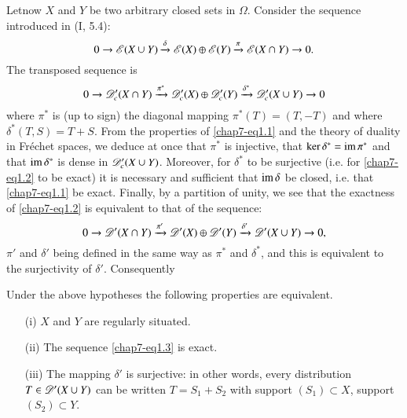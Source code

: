 \eject

Let\pageoriginale now $X$ and $Y$ be two arbitrary closed sets in $\Omega$. Consider the sequence introduced in (I, 5.4):
\begin{equation}
0\to \mathscr{E}(X\cup Y)\xrightarrow{\delta}\mathscr{E}(X)\oplus \mathscr{E}(Y)\xrightarrow{\pi}\mathscr{E}(X\cap Y)\to 0.\label{chap7-eq1.1}
\end{equation}
The transposed sequence is
\begin{equation}
0\to \mathscr{D}'_{c}(X\cap Y)\xrightarrow{\pi^{*}}\mathscr{D}'_{c}(X)\oplus \mathscr{D}'_{c}(Y)\xrightarrow{\delta^{*}}\mathscr{D}'_{c}(X\cup Y)\to 0\label{chap7-eq1.2}
\end{equation}
where $\pi^{*}$ is (up to sign) the diagonal mapping $\pi^{*}(T)=(T,-T)$ and where $\delta^{*}(T,S)=T+S$. From the properties of \eqref{chap7-eq1.1} and the theory of duality in Fr\'echet spaces, we deduce at once that $\pi^{*}$ is injective, that $\ker \delta^{*}=\operatorname{im} \pi^{*}$ and that $\operatorname{im} \delta^{*}$ is dense in $\mathscr{D}'_{c}(X\cup Y)$. Moreover, for $\delta^{*}$ to be surjective (i.e. for \eqref{chap7-eq1.2} to be exact) it is necessary and sufficient that $\operatorname{im} \delta$ be closed, i.e. that \eqref{chap7-eq1.1} be exact. Finally, by a partition of unity, we see that the exactness of \eqref{chap7-eq1.2} is equivalent to that of the sequence:
\begin{equation}
0\to \mathscr{D}'(X\cap Y)\xrightarrow{\pi'}\mathscr{D}'(X)\oplus \mathscr{D}'(Y)\xrightarrow{\delta'}\mathscr{D}'(X\cup Y)\to 0,\label{chap7-eq1.3}
\end{equation}
$\pi'$ and $\delta'$ being defined in the same way as $\pi^{*}$ and $\delta^{*}$, and this is equivalent to the surjectivity of $\delta'$. Consequently

\setcounter{theorem}{3}
\begin{proposition}\label{chap7-prop1.4}
Under the above hypotheses the following properties are equivalent.
\begin{itemize}
\itemsep=0pt
\item[\rm(i)] $X$ and $Y$ are regularly situated.

\item[\rm(ii)] The sequence \eqref{chap7-eq1.3} is exact.

\item[\rm(iii)] The mapping $\delta'$ is surjective: in other words, every distribution $T\in \mathscr{D}'(X\cup Y)$ can be written $T=S_{1}+S_{2}$ with support $(S_{1})\subset X$, support $(S_{2})\subset Y$.
\end{itemize}
\end{proposition}

